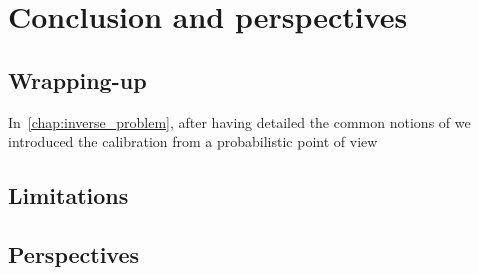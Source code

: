 \documentclass[../../Main_ManuscritThese.tex]{subfiles}
\begin{document}
\relax

\begingroup


\TitleBtwLines

\chapter*{Conclusion and perspectives}
{}

\label{chap:Conclusion}
\pagestyle{conclusionStyle}
\renewcommand{\thesection}{}

\section{Wrapping-up}
In~\cref{chap:inverse_problem}, after having detailed the common notions of we introduced the calibration from a probabilistic point of view
\section{Limitations}

\section{Perspectives}


\subfileLocal{
	\pagestyle{empty}
	
        
}
\relax

\endgroup
\end{document}
